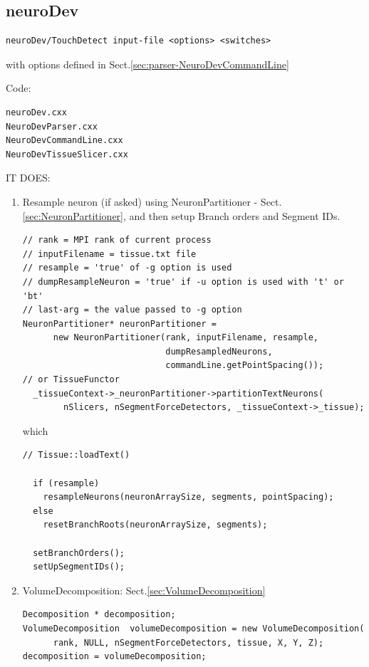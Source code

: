 \subsection{neuroDev}
\label{sec:neuroDev}


\begin{verbatim}
neuroDev/TouchDetect input-file <options> <switches>
\end{verbatim}
with options defined in Sect.\ref{sec:parser-NeuroDevCommandLine}

Code:
\begin{verbatim}
neuroDev.cxx
NeuroDevParser.cxx
NeuroDevCommandLine.cxx
NeuroDevTissueSlicer.cxx
\end{verbatim}

IT DOES:
\begin{enumerate}
  \item Resample neuron (if asked) using NeuronPartitioner -
  Sect.\ref{sec:NeuronPartitioner}, and then setup Branch orders and Segment
  IDs.

\begin{verbatim}
// rank = MPI rank of current process
// inputFilename = tissue.txt file
// resample = 'true' of -g option is used
// dumpResampleNeuron = 'true' if -u option is used with 't' or 'bt'
// last-arg = the value passed to -g option 
NeuronPartitioner* neuronPartitioner =
      new NeuronPartitioner(rank, inputFilename, resample, 
                            dumpResampledNeurons,
                            commandLine.getPointSpacing());
// or TissueFunctor
  _tissueContext->_neuronPartitioner->partitionTextNeurons(
        nSlicers, nSegmentForceDetectors, _tissueContext->_tissue);
\end{verbatim}  

which
\begin{verbatim}
// Tissue::loadText()

  if (resample)
    resampleNeurons(neuronArraySize, segments, pointSpacing);
  else
    resetBranchRoots(neuronArraySize, segments);

  setBranchOrders();
  setUpSegmentIDs();
\end{verbatim}
  

  \item VolumeDecomposition: Sect.\ref{sec:VolumeDecomposition}
  
\begin{verbatim}
Decomposition * decomposition;
VolumeDecomposition  volumeDecomposition = new VolumeDecomposition(
      rank, NULL, nSegmentForceDetectors, tissue, X, Y, Z);
decomposition = volumeDecomposition;


\end{verbatim}
\end{enumerate}
